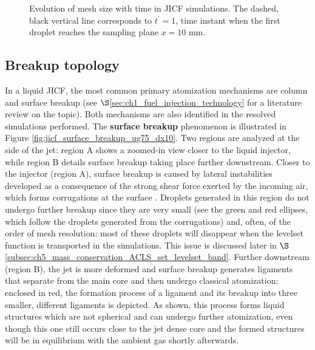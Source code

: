 \begin{figure}[ht]
%
   \caption[Evolution of mesh size with time in JICF simulations]{Evolution of mesh size with time in JICF simulations. The dashed, black vertical line corresponds to $t^\prime = 1$, time instant when the first droplet reaches the sampling plane $x = 10$ mm.}
\label{fig:JICF_nelem_increase}
\end{figure}

\subsection{Breakup topology}
\label{subsubsec:ch5_breakup_topology}

In a liquid JICF, the most common primary atomization mechanisms are column and surface breakup (see $\S$\ref{sec:ch1_fuel_injection_technology} for a literature review on the topic). Both mechanisms are also identified in the resolved simulations performed. The \textbf{surface breakup} phenomenon is illustrated in Figure \ref{fig:jicf_surface_breakup_ug75_dx10}. Two regions are analyzed at the side of the jet: region A shows a zoomed-in view closer to the liquid injector, while region B details surface breakup taking place further downstream. Closer to the injector (region A), surface breakup is caused by lateral instabilities developed as a consequence of the strong shear force exerted by the incoming air, which forms corrugations at the surface . Droplets generated in this region do not undergo further breakup since they are very small (see the green and red ellipses, which follow the droplets generated from the corrugations) and, often, of the order of mesh resolution: most of these droplets will disappear when the levelset function is transported in the simulations. This issue is discussed later in $\S$\ref{subsec:ch5_mass_conservation_ACLS_set_levelset_band}. Further downstream (region B), the jet is more deformed and surface breakup generates ligaments that separate from the main core and then undergo classical atomization: enclosed in red, the formation process of a ligament and its breakup into three smaller, different ligaments is depicted. As shown, this process forms liquid structures which are not spherical and can undergo further atomization, even though this one still occurs close to the jet dense core and the formed structures will be in equilibrium with the ambient gas shortly afterwards.

